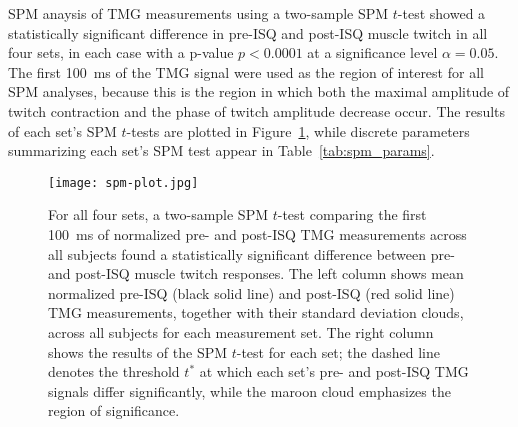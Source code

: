 \documentclass[utf8]{style/FrontiersinHarvard}
\begin{document}
\begin{table}[htb!]
    \centering
    \caption{Post-ISQ twitch contraction parameter values from sets 1, 2, 3, and 4 compared to the pre-ISQ values from set 1,
    so mean pre-ISQ values are shown only for set 1.
    All parameters have the same meanings as in Table~\ref{tab:tmg_params}.
    As in Table~\ref{tab:tmg_params}, note the consistent, potentiation-like increase in muscle amplitude and decrease in contraction time.
    }
    \vspace{1ex}

    \renewcommand{\arraystretch}{1.2}
    
    \label{tab:tmg_params_staggered}
\end{table}

SPM anaysis of TMG measurements using a two-sample SPM $ t $-test showed a statistically significant difference in pre-ISQ and post-ISQ muscle twitch in all four sets, in each case with a p-value $ p < 0.0001 $ at a significance level $ \alpha = 0.05 $.
The first \SI{100}{\milli \second} of the TMG signal were used as the region of interest for all SPM analyses, because this is the region in which both the maximal amplitude of twitch contraction and the phase of twitch amplitude decrease occur.
The results of each set's SPM $ t $-tests are plotted in Figure~\ref{fig:spm_plot}, while discrete parameters summarizing each set's SPM test appear in Table~\ref{tab:spm_params}.

\begin{figure}
	\centering
    \texttt{[image: spm-plot.jpg]}
    \caption{For all four sets, a two-sample SPM $ t $-test comparing the first \SI{100}{\milli \second} of normalized pre- and post-ISQ TMG measurements across all subjects found a statistically significant difference between pre- and post-ISQ muscle twitch responses.
    The left column shows mean normalized pre-ISQ (black solid line) and post-ISQ (red solid line) TMG measurements, together with their standard deviation clouds, across all subjects for each measurement set.
    The right column shows the results of the SPM $ t $-test for each set;
    the dashed line denotes the threshold $ t^{*} $ at which each set's pre- and post-ISQ TMG signals differ significantly, while the maroon cloud emphasizes the region of significance.}
    \label{fig:spm_plot}
\end{figure}
\end{document}
